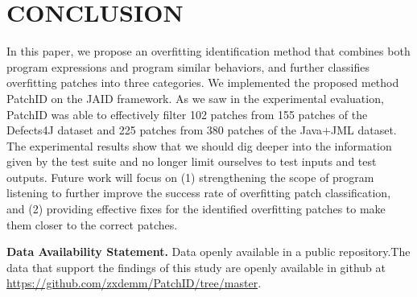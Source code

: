 \section{CONCLUSION}
In this paper, we propose an overfitting identification method that combines both program expressions and program similar behaviors, and further classifies overfitting patches into three categories. We implemented the proposed method PatchID on the JAID framework. As we saw in the experimental evaluation, PatchID was able to effectively filter 102 patches from 155 patches of the Defects4J dataset and 225 patches from 380 patches of the Java+JML dataset. The experimental results show that we should dig deeper into the information given by the test suite and no longer limit ourselves to test inputs and test outputs. Future work will focus on (1) strengthening the scope of program listening to further improve the success rate of overfitting patch classification, and (2) providing effective fixes for the identified overfitting patches to make them closer to the correct patches.

\textbf{Data Availability Statement.}
Data openly available in a public repository.The data that support the findings of this study are openly available in github at \href{https://github.com/zxdemm/PatchID/tree/master}{https://github.com/zxdemm/PatchID/tree/master}.

